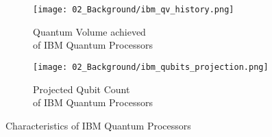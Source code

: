 \begin{figure}[!ht]
  \begin{subfigure}[b]{0.5 \textwidth}
    \centering
    \texttt{[image: 02\_Background/ibm\_qv\_history.png]}
    \caption{Quantum Volume achieved\\ of IBM Quantum Processors \cite{IBMqv2020}}
    \label{figure:gate.qv.history}
  \end{subfigure}
  \begin{subfigure}[b]{0.5 \textwidth}
    \centering
    \texttt{[image: 02\_Background/ibm\_qubits\_projection.png]}
    \caption{Projected Qubit Count\\ of IBM Quantum Processors \cite{IBMRoadmap2020}}
    \label{figure:gate.qbits.projection}
  \end{subfigure}
  \caption{Characteristics of IBM Quantum Processors}
\end{figure}
